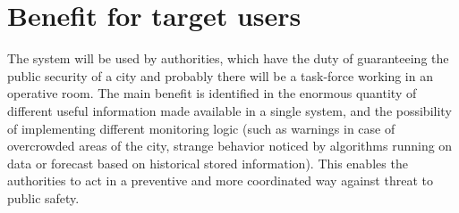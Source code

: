 \documentclass[../main.tex]{subfiles}
\begin{document}
    \section{Benefit for target users}\label{sec:benefit-for-target-users}
    The system will be used by authorities, which have the duty of guaranteeing the public security of a city and probably there will be a task-force working in an operative room.
    The main benefit is identified in the enormous quantity of different useful information made available in a single system, and the possibility of implementing different monitoring logic (such as warnings in case of overcrowded areas of the city, strange behavior noticed by algorithms running on data or forecast based on historical stored information). This enables
    the authorities to act in a preventive and more coordinated way against threat to public safety.
\end{document}
